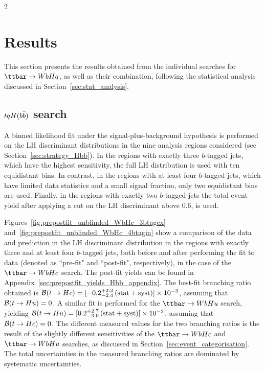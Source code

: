 2%
\section{Results}
\label{sec:result}

This section presents the results obtained from the individual searches for $\Hq$, as well as their combination,
following the statistical analysis discussed in Section~\ref{sec:stat_analysis}.

\subsection{$tqH(b\bar{b})$ search}
\label{sec:results_Hbb}

A binned likelihood fit under the signal-plus-background hypothesis 
is performed on the LH discriminant distributions in the nine analysis regions considered (see Section~\ref{sec:strategy_Hbb}).
In the regions with exactly three $b$-tagged jets, which have the highest sensitivity, the full LH distribution is used with ten equidistant bins. 
In contrast, in the regions with at least four $b$-tagged jets,
which have limited data statistics and a small signal fraction, only two equidistant bins are used. Finally, in the regions with exactly two $b$-tagged jets 
the total event yield after applying a cut on the LH discriminant above 0.6, is used. 

Figures~\ref{fig:prepostfit_unblinded_WbHc_3btagex} and~\ref{fig:prepostfit_unblinded_WbHc_4btagin} show a comparison 
of the data and prediction in the LH discriminant distribution in the regions with exactly three and at least four $b$-tagged jets, 
both before and after performing the fit to data (denoted as ``pre-fit" and ``post-fit", respectively), in the case of the $\Hc$ search.  
The post-fit yields can be found in Appendix~\ref{sec:prepostfit_yields_Hbb_appendix}.
The best-fit branching ratio obtained is $\mathcal{B}(t\to Hc)=[-0.2^{+2.2}_{-2.4}\,(\mathrm{stat+syst})] \times 10^{-3}$,
assuming that $\mathcal{B}(t\to Hu)=0$. 
A similar fit is performed for the $\Hu$ search, yielding $\mathcal{B}(t\to Hu)=[0.2^{+2.7}_{-3.0}\,(\mathrm{stat+syst})] \times 10^{-3}$,
assuming that $\mathcal{B}(t\to Hc)=0$.  The different measured values for the two branching ratios is the result of the slightly different sensitivities
of the $\Hc$ and $\Hu$ searches, as discussed in Section~\ref{sec:event_categorisation}.
The total uncertainties in the measured branching ratios are dominated by systematic uncertainties.

